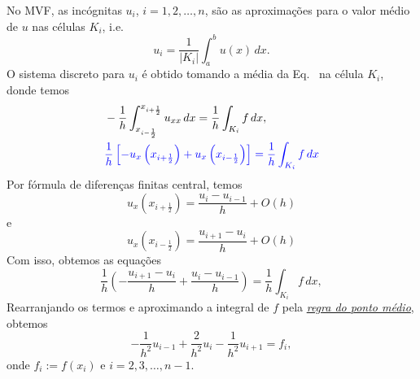 \begin{flushleft}
\end{flushleft}

No MVF, as incógnitas $u_i$, $i = 1, 2, \dotsc, n$, são as aproximações para o valor médio de $u$ nas células $K_i$, i.e.
\begin{equation}
  u_i = \frac{1}{|K_i|}\int_{a}^{b}u(x)\,dx.
\end{equation}
O sistema discreto para $u_i$ é obtido tomando a média da Eq.~\label{cap_pvc_sec_fem:eq:pvc_eq} na célula $K_i$, donde temos
\begin{subequations}
  \begin{align}
    &-\frac{1}{h}\int_{x_{i-\frac{1}{2}}}^{x_{i+\frac{1}{2}}}u_{xx}\,dx = \frac{1}{h}\int_{K_i}f\,dx,\\
    &\color{blue}\frac{1}{h}\left[-u_x\left(x_{i+\frac{1}{2}}\right) + u_x\left(x_{i-\frac{1}{2}}\right)\right] = \frac{1}{h}\int_{K_i}f\,dx\label{cap_pvc_sec_fvm:eq:aux00}
  \end{align}
\end{subequations}
Por fórmula de diferenças finitas central, temos
\begin{equation}
  u_{x}\left(x_{i+\frac{1}{2}}\right) = \frac{u_i - u_{i-1}}{h} + O(h)
\end{equation}
e
\begin{equation}
  u_x\left(x_{i-\frac{1}{2}}\right) = \frac{u_{i+1} - u_i}{h} + O(h)
\end{equation}
Com isso, obtemos as equações
\begin{equation}\label{cap_pvc_sec_fvm:eq:aux0}
  \frac{1}{h}\left(-\frac{u_{i+1}-u_{i}}{h} + \frac{u_i - u_{i-1}}{h}\right) = \frac{1}{h}\int_{K_i}f\,dx,
\end{equation}
Rearranjando os termos e aproximando a integral de $f$ pela \href{https://notaspedrok.com.br/notas/MatematicaNumericaII/cap_integr_sec_nc.html}{\emph{regra do ponto médio}}, obtemos
\begin{equation}\label{cap_pvc_sec_fvm:eq:aux}
  -\frac{1}{h^2}u_{i-1} + \frac{2}{h^2}u_i - \frac{1}{h^2}u_{i+1} = f_i,
\end{equation}
onde $f_i := f(x_i)$ e $i = 2, 3, \dotsc, n-1$.

